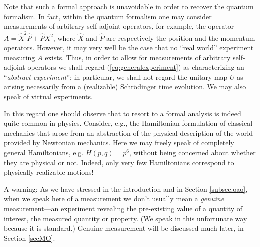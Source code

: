 \documentclass[12pt]{article}
\newcommand{\Sc}{Schr\"{o}dinger}
\newcommand{\sa}{self-adjoint}
\begin{document}
   Note that such a formal approach is unavoidable in order to recover
   the quantum formalism.  In fact, within the quantum formalism one
   may consider measurements of arbitrary \sa{} operators, for example,
   the operator $A= \hat{X}^2\hat{P} + \hat{P}X^{2}$, where $\hat{X}$
   and $\hat{P}$ are respectively the position and the momentum
   operators.  However, it may very well be the case that no ``real
   world'' experiment measuring $A$ exists.  Thus, in order to allow
   for measurements of arbitrary self-adjoint operators we shall regard
   (\ref{eq:generalexperiment}) as characterizing an ``\emph{abstract
     experiment}''; in particular, we shall not regard the unitary map
   $U$ as arising necessarily {}from a (realizable) \Sc{} time
   evolution.  We may also speak of virtual experiments.

   In this regard one should observe that to resort to a formal
   analysis is indeed quite common in physics.  Consider, e.g., the
   Hamiltonian formulation of classical mechanics that arose {}from an
   abstraction of the physical description of the world provided by
   Newtonian mechanics.  Here we may freely speak of completely general
   Hamiltonians, e.g.  $H(p,q)= p^{6}$, without being concerned about
   whether they are physical or not.  Indeed, only very few
   Hamiltonians correspond to physically realizable motions!  \medskip

   A warning: As we have stressed in the introduction and in Section
   \ref{subsec.oao}, when we speak here of a measurement we don't
   usually mean a {\em genuine} measurement---an experiment revealing
   the pre-existing value of a quantity of interest, the measured
   quantity or property. (We speak in this unfortunate way because it
   is standard.)  Genuine measurement will be discussed much later, in
   Section \ref{secMO}.
\end{document}
